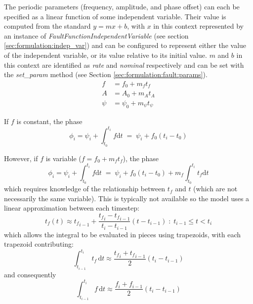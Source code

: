 \documentclass[11pt,fleqn]{report}
\begin{document}
The periodic parameters (frequency, amplitude, and phase offset) can each be
specified as a linear function of some independent variable.
Their value is computed from the standard $y=mx+b$, with $x$ in this context
represented by an instance of \textit{FaultFunctionIndependentVariable} (see
section \ref{sec:formulation:indep_var}) and can be configured to represent
either the value of the independent variable, or its value relative to its
initial value. $m$ and $b$ in this context are identified as \textit{rate} and
\textit{nominal} respectively and can be set with the \textit{set\_param}
method (see Section \ref{sec:formulation:fault:params}).
\begin{align*}
  f &= f_0 + m_f t_f \\
  A &= A_0 + m_A t_A \\
  \psi &= {\psi_0} + m_{\psi} t_{\psi}
\end{align*}

If $f$ is constant, the phase
\begin{equation*}
  \phi_i = \psi_i + \int_{t_0}^{t_i} f \mathrm{d}t  \;=\;
           \psi_i + f_0(t_i - t_0)
\end{equation*}

However, if $f$ is variable ($f=f_0 + m_f t_f$), the phase
\begin{equation*}
  \phi_i = \psi_i + \int_{t_0}^{t_i} f \mathrm{d}t  \;=\;
           \psi_i + f_0(t_i - t_0) + m_f \int_{t_0}^{t_i} t_f \mathrm{d}t
\end{equation*}
which requires knowledge of the relationship between $t_f$ and $t$ (which are
not necessarily the same variable). This is typically not available so the model
uses a linear approximation between each timestep:
\begin{equation} \label{eqn:tfinterp}
t_f (t) \approx {t_f}_{i-1} + \frac{{t_f}_i - {t_f}_{i-1}}
                                    {t_i - t_{i-1}}
                                    (t - t_{i-1})
        \;:\; t_{i-1} \leq t < t_i
\end{equation}
which allows the integral to be evaluated in pieces using trapezoids, with each
trapezoid contributing:
\begin{equation*}
\int_{t_{i-1}}^{t_i} t_f \, \mathrm{d}t \approx \frac{{t_f}_i + {t_f}_{i-1}}{2}
                                                (t_i - t_{i-1})
\end{equation*}
and consequently
\begin{equation*}
 \int_{t_{i-1}}^{t_i} f \, \mathrm{d}t
    \approx \frac{f_i + f_{i-1}}{2}  (t_i - t_{i-1})
\end{equation*}
\end{document}
